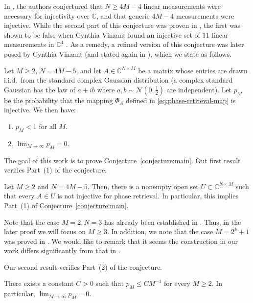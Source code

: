 \documentclass[11pt,reqno]{amsart}
\begin{document}
In \cite{bandeira2014saving}, the authors conjectured that $N \geq 4M-4$ linear measurements were necessary for injectivity over $\mathbb C$, and that generic $4M-4$ measurements were injective. While the second part of this conjecture was proven in \cite{conca2015algebraic}, the first was shown to be false when Cynthia Vinzant found an injective set of $11$ linear measurements in $\mathbb C^4$ \cite{vinzant2015small}. As a remedy, a refined version of this conjecture was later posed by Cynthia Vinzant (and stated again in \cite{bandeira2026randomstrasse101}), which we state as follows.
\begin{conj}{\label{conjecture:main}}
    Let $M\ge2$, $N=4M-5$, and let $A \in \mathbb C^{N\times M}$ be a matrix whose entries are drawn i.i.d.\ from the standard complex Gaussian distribution (a complex standard Gaussian has the law of $a+ib$ where $a,b \sim \mathcal N(0,\frac{1}{2})$ are independent). Let $p_M$ be the probability that the mapping $\Phi_A$ defined in \eqref{eq:phase-retrieval-map} is injective. We then have:
    \begin{enumerate}
        \item[(1)] $p_M<1$ for all $M$.
        \item[(2)] $\lim_{M \to\infty} p_M=0$.
    \end{enumerate}
\end{conj}
The goal of this work is to prove Conjecture~\ref{conjecture:main}. Out first result verifies Part~(1) of the conjecture.
\begin{thm}{\label{thm:main-1}}
    Let $M \geq 2$ and $N=4M-5$. Then, there is a nonempty open set $U \subset \mathbb C^{N\times M}$ such that every $A \in U$ is not injective for phase retrieval. In particular, this implies Part~(1) of Conjecture~\ref{conjecture:main}.
\end{thm}
\begin{rmk}
    Note that the case $M=2,N=3$ has already been established in \cite{bandeira2014saving}. Thus, in the later proof we will focus on $M \geq 3$. In addition, we note that the case $M=2^k+1$ was proved in \cite{conca2015algebraic}. We would like to remark that it seems the construction in our work differs significantly from that in \cite{conca2015algebraic}.
\end{rmk}
Our second result verifies Part~(2) of the conjecture.
\begin{thm}\label{thm:main-2}
    There exists a constant $C>0$ such that $p_M\le C M^{-1}$ for every $M \ge 2$. In particular, $\lim_{M\to\infty}p_M=0$.
\end{thm}
\end{document}
